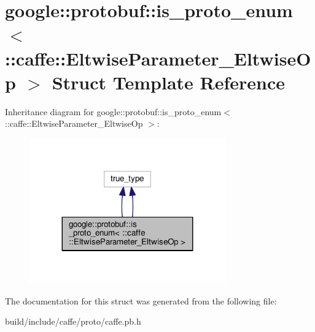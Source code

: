 \hypertarget{structgoogle_1_1protobuf_1_1is__proto__enum_3_01_1_1caffe_1_1_eltwise_parameter___eltwise_op_01_4}{}\section{google\+:\+:protobuf\+:\+:is\+\_\+proto\+\_\+enum$<$ \+:\+:caffe\+:\+:Eltwise\+Parameter\+\_\+\+Eltwise\+Op $>$ Struct Template Reference}
\label{structgoogle_1_1protobuf_1_1is__proto__enum_3_01_1_1caffe_1_1_eltwise_parameter___eltwise_op_01_4}


Inheritance diagram for google\+:\+:protobuf\+:\+:is\+\_\+proto\+\_\+enum$<$ \+:\+:caffe\+:\+:Eltwise\+Parameter\+\_\+\+Eltwise\+Op $>$\+:
\nopagebreak
\begin{figure}[H]
\begin{center}
\leavevmode
\includegraphics[width=239pt]{structgoogle_1_1protobuf_1_1is__proto__enum_3_01_1_1caffe_1_1_eltwise_parameter___eltwise_op_01_4__inherit__graph}
\end{center}
\end{figure}


The documentation for this struct was generated from the following file\+:\begin{DoxyCompactItemize}
\item 
build/include/caffe/proto/caffe.\+pb.\+h\end{DoxyCompactItemize}
